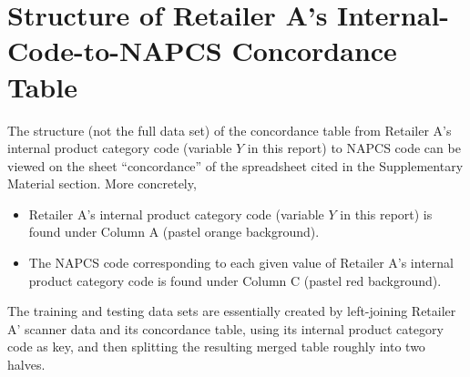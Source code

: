 
\section{Structure of Retailer A's Internal-Code-to-NAPCS Concordance Table}
\setcounter{theorem}{0}
\setcounter{equation}{0}



The structure (not the full data set) of the concordance table from
Retailer A's internal product category code (variable $Y$ in this report) to NAPCS code
can be viewed on the sheet ``concordance'' of the spreadsheet cited in the
Supplementary Material section.
More concretely,
\begin{itemize}
\item
	Retailer A's internal product category code (variable $Y$ in this report)
	is found under Column A (pastel orange background).
\item
	The NAPCS code corresponding to each given value of Retailer A's
	internal product category code is found under
	Column C (pastel red background). 
\end{itemize}
The training and testing data sets are essentially created by left-joining
Retailer A' scanner data and its concordance table,
using its internal product category code as key, and then splitting the resulting
merged table roughly into two halves.


